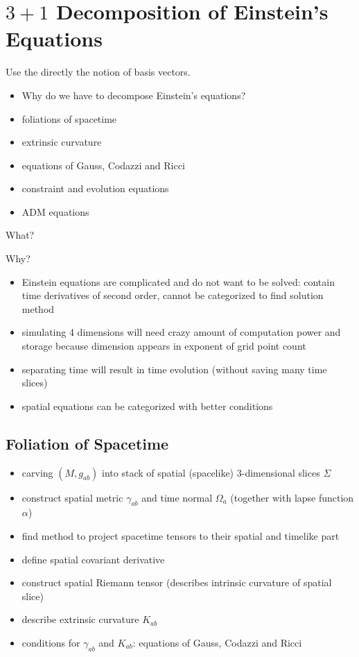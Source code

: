 \documentclass[twocolumn]{article}
\begin{document}
  \section{$3+1$ Decomposition of Einstein's Equations} %
    Use the directly the notion of basis vectors.

    \begin{itemize}
      \item Why do we have to decompose Einstein's equations?
      \item foliations of spacetime
      \item extrinsic curvature
      \item equations of Gauss, Codazzi and Ricci
      \item constraint and evolution equations
      \item ADM equations
    \end{itemize}

    What?

    Why?
    \begin{itemize}
      \item Einstein equations are complicated and do not want to be solved: contain time derivatives of second order, cannot be categorized to find solution method
      \item simulating 4 dimensions will need crazy amount of computation power and storage because dimension appears in exponent of grid point count
      \item separating time will result in time evolution (without saving many time slices)
      \item spatial equations can be categorized with better conditions
    \end{itemize}

    \subsection{Foliation of Spacetime} %
    \label{sub:foliation_of_spacetime}
      \begin{itemize}
        \item carving $(M,g_{ab})$ into stack of spatial (spacelike) $3$-dimensional slices $Σ$
        \item construct spatial metric $γ_{ab}$ and time normal $\Omega_a$ (together with lapse function $α$)
        \item find method to project spacetime tensors to their spatial and timelike part
        \item define spatial covariant derivative
        \item construct spatial Riemann tensor (describes intrinsic curvature of spatial slice)
        \item describe extrinsic curvature $K_{ab}$
        \item conditions for $γ_{ab}$ and $K_{ab}$: equations of Gauss, Codazzi and Ricci
      \end{itemize}
\end{document}
